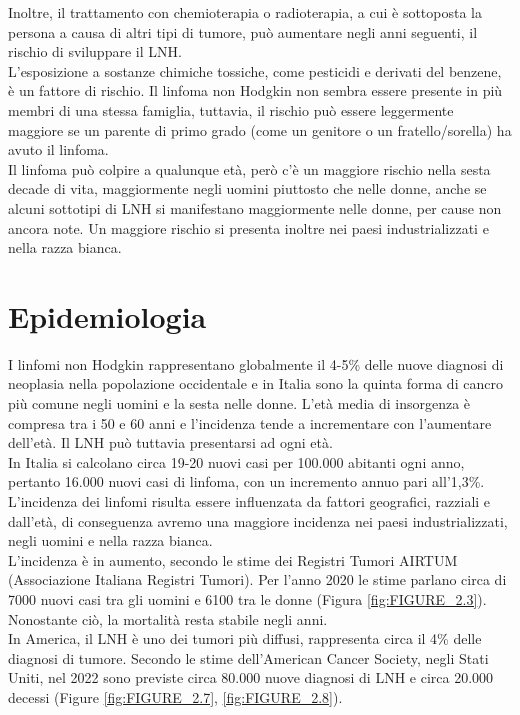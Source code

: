 Inoltre, il trattamento con chemioterapia o radioterapia, a cui è sottoposta la persona a causa di altri tipi di tumore, 
può aumentare negli anni seguenti, il rischio di sviluppare il LNH\cite{AMERICANCS}.\\
L’esposizione a sostanze chimiche tossiche, come pesticidi e derivati del benzene, è un fattore di rischio. 
Il linfoma non Hodgkin non sembra essere presente in più membri di una stessa famiglia, tuttavia, 
il rischio può essere leggermente maggiore se un parente di primo grado (come un genitore o un fratello/sorella) 
ha avuto il linfoma\cite{AMERICANCS}.\\
Il linfoma può colpire a qualunque età, però c’è un maggiore rischio nella sesta decade di vita, 
maggiormente negli uomini piuttosto che nelle donne, anche se alcuni sottotipi di LNH si manifestano 
maggiormente nelle donne, per cause non ancora note. 
Un maggiore rischio si presenta inoltre nei paesi industrializzati e nella razza bianca\cite{AMERICANCS}.\\ 

\section{Epidemiologia}
I linfomi non Hodgkin rappresentano globalmente il 4-5\% delle nuove diagnosi di neoplasia nella popolazione 
occidentale e in Italia sono la quinta forma di cancro più comune negli uomini e la sesta nelle donne\cite{AIOM}. 
L’età media di insorgenza è compresa tra i 50 e 60 anni e l’incidenza tende a incrementare con l’aumentare dell’età. 
Il LNH può tuttavia presentarsi ad ogni età.\\ 
In Italia si calcolano circa 19-20 nuovi casi per 100.000 abitanti ogni anno, pertanto 16.000 nuovi casi di linfoma, 
con un incremento annuo pari all’1,3\%\cite{AIOM}.\\
L’incidenza dei linfomi risulta essere influenzata da fattori geografici, razziali e dall'età, 
di conseguenza avremo una maggiore incidenza nei paesi industrializzati, negli uomini e nella razza bianca\cite{AIOM}.\\
L’incidenza è in aumento, secondo le stime dei Registri Tumori AIRTUM (Associazione Italiana Registri Tumori).
Per l’anno 2020 le stime parlano circa di 7000 nuovi casi tra gli uomini e 6100 tra le donne (Figura \ref{fig:FIGURE_2.3}). 
Nonostante ciò, la mortalità resta stabile negli anni\cite{AIRC}.\\
In America, il LNH è uno dei tumori più diffusi, rappresenta circa il 4\% delle diagnosi di tumore. 
Secondo le stime dell’American Cancer Society, negli Stati Uniti, nel 2022 sono previste circa 80.000 nuove 
diagnosi di LNH e circa 20.000 decessi (Figure \ref{fig:FIGURE_2.7}, \ref{fig:FIGURE_2.8})\cite{Americanstatistic}.\\

